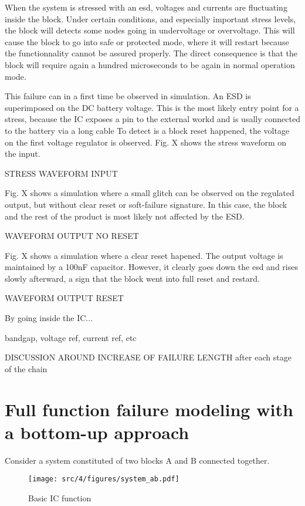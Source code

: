 When the system is stressed with an \gls{esd}, voltages and currents are fluctuating inside the block.
Under certain conditions, and especially important stress levels, the block will detects some nodes going in undervoltage or overvoltage.
This will cause the block to go into safe or protected mode, where it will restart because the functionnality cannot be assured properly.
The direct consequence is that the block will require again a hundred microseconds to be again in normal operation mode.

This failure can in a first time be observed in simulation.
An \gls{ESD} is superimposed on the DC battery voltage.
This is the most likely entry point for a stress, because the \gls{IC} exposes a pin to the external workd and is usally connected to the battery via a long cable
To detect is a block reset happened, the voltage on the first voltage regulator is observed.
Fig. X shows the stress waveform on the input.

STRESS WAVEFORM INPUT

Fig. X shows a simulation where a small glitch can be observed on the regulated output, but without clear reset or soft-failure signature.
In this case, the block and the rest of the product is most likely not affected by the ESD.

WAVEFORM OUTPUT NO RESET

Fig. X shows a simulation where a clear reset hapened.
The output voltage is maintained by a 100nF capacitor.
However, it clearly goes down  the \gls{esd} and rises slowly afterward, a sign that the block went into full reset and restard.

WAVEFORM OUTPUT RESET

By going inside the \gls{IC}...

bandgap, voltage ref, current ref, etc

DISCUSSION AROUND INCREASE OF FAILURE LENGTH after each stage of the chain

\section{Full function failure modeling with a bottom-up approach}

Consider a system constituted of two blocks A and B connected together.

\begin{figure}[h]
  \centering
  \texttt{[image: src/4/figures/system\_ab.pdf]}
  \caption{Basic IC function}
  \label{basic_ic_function}
\end{figure}

